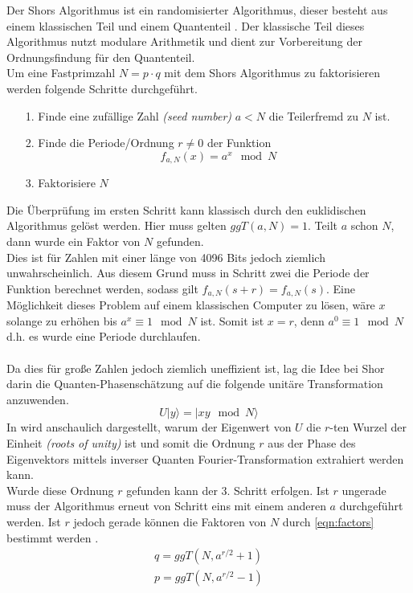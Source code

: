 Der Shors Algorithmus ist ein randomisierter Algorithmus, dieser besteht aus einem klassischen Teil und einem Quantenteil \cite{Shor_1997}. Der klassische Teil dieses Algorithmus nutzt modulare Arithmetik und dient zur Vorbereitung der Ordnungsfindung f\"ur den Quantenteil.\\
Um eine Fastprimzahl $N = p\cdot q$ mit dem Shors Algorithmus zu faktorisieren werden folgende Schritte durchgef\"uhrt.
\begin{itemize}
  \item[1.] Finde eine zuf\"allige Zahl \textit{(seed number)} $a < N$ die Teilerfremd zu $N$ ist.
  \item[2.] Finde die Periode/Ordnung $r \neq 0$ der Funktion $$f_{a,N}(x) = a^x \mod N$$
  \item[3.] Faktorisiere $N$ 
\end{itemize}
Die \"Uberpr\"ufung im ersten Schritt kann klassisch durch den euklidischen Algorithmus gel\"ost werden. Hier muss gelten $ggT(a,N) = 1$. Teilt $a$ schon $N$, dann wurde ein Faktor von $N$ gefunden.\\ Dies ist f\"ur Zahlen mit einer l\"ange von 4096 Bits jedoch ziemlich unwahrscheinlich. Aus diesem Grund muss in Schritt zwei die Periode der Funktion berechnet werden, sodass gilt $f_{a,N}(s+r) = f_{a,N}(s)$. Eine M\"oglichkeit dieses Problem auf einem klassischen Computer zu l\"osen, w\"are $x$ solange zu erh\"ohen bis $a^x \equiv 1 \mod N$ ist. Somit ist $x = r$, denn $a^0 \equiv 1 \mod N$ d.h. es wurde eine Periode durchlaufen.\\\\Da dies f\"ur gro\ss e Zahlen jedoch ziemlich uneffizient ist, lag die Idee bei Shor darin die Quanten-Phasensch\"atzung auf die folgende unit\"are Transformation anzuwenden. 
\begin{equation}
  U|y\rangle = |xy \mod N \rangle
\end{equation}
In \cite[p.~196~ff.]{hundt_2022} wird anschaulich dargestellt, warum der Eigenwert von $U$ die $r$-ten Wurzel der Einheit \textit{(roots of unity)} ist und somit die Ordnung $r$ aus der Phase des Eigenvektors mittels inverser Quanten Fourier-Transformation extrahiert werden kann. \\
Wurde diese Ordnung $r$ gefunden kann der 3. Schritt erfolgen. Ist $r$ ungerade muss der Algorithmus erneut von Schritt eins mit einem anderen $a$ durchgef\"uhrt werden. Ist $r$ jedoch gerade k\"onnen die Faktoren von $N$ durch \ref{eqn:factors} bestimmt werden \cite{hundt_2022}.
\begin{equation}
  \label{eqn:factors}
  \begin{aligned}
  q = ggT(N, a^{r/2}+1) \\
  p = ggT(N, a^{r/2}-1)
  \end{aligned}
\end{equation}
